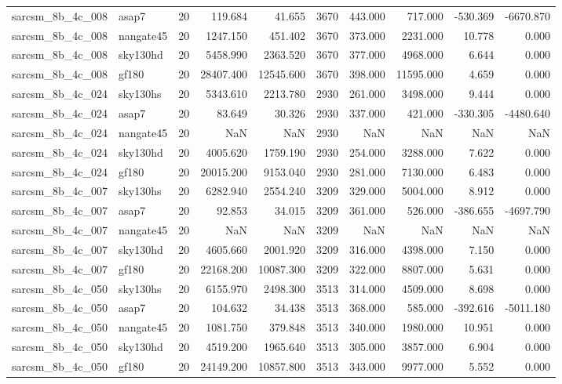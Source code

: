\documentclass{article}
\begin{document}
\begin{longtable}{llrrrrrrrr}
sarcsm\_8b\_4c\_008 & asap7 & 20 & 119.684 & 41.655 & 3670 & 443.000 & 717.000 & -530.369 & -6670.870 \\
sarcsm\_8b\_4c\_008 & nangate45 & 20 & 1247.150 & 451.402 & 3670 & 373.000 & 2231.000 & 10.778 & 0.000 \\
sarcsm\_8b\_4c\_008 & sky130hd & 20 & 5458.990 & 2363.520 & 3670 & 377.000 & 4968.000 & 6.644 & 0.000 \\
sarcsm\_8b\_4c\_008 & gf180 & 20 & 28407.400 & 12545.600 & 3670 & 398.000 & 11595.000 & 4.659 & 0.000 \\
sarcsm\_8b\_4c\_024 & sky130hs & 20 & 5343.610 & 2213.780 & 2930 & 261.000 & 3498.000 & 9.444 & 0.000 \\
sarcsm\_8b\_4c\_024 & asap7 & 20 & 83.649 & 30.326 & 2930 & 337.000 & 421.000 & -330.305 & -4480.640 \\
sarcsm\_8b\_4c\_024 & nangate45 & 20 & NaN & NaN & 2930 & NaN & NaN & NaN & NaN \\
sarcsm\_8b\_4c\_024 & sky130hd & 20 & 4005.620 & 1759.190 & 2930 & 254.000 & 3288.000 & 7.622 & 0.000 \\
sarcsm\_8b\_4c\_024 & gf180 & 20 & 20015.200 & 9153.040 & 2930 & 281.000 & 7130.000 & 6.483 & 0.000 \\
sarcsm\_8b\_4c\_007 & sky130hs & 20 & 6282.940 & 2554.240 & 3209 & 329.000 & 5004.000 & 8.912 & 0.000 \\
sarcsm\_8b\_4c\_007 & asap7 & 20 & 92.853 & 34.015 & 3209 & 361.000 & 526.000 & -386.655 & -4697.790 \\
sarcsm\_8b\_4c\_007 & nangate45 & 20 & NaN & NaN & 3209 & NaN & NaN & NaN & NaN \\
sarcsm\_8b\_4c\_007 & sky130hd & 20 & 4605.660 & 2001.920 & 3209 & 316.000 & 4398.000 & 7.150 & 0.000 \\
sarcsm\_8b\_4c\_007 & gf180 & 20 & 22168.200 & 10087.300 & 3209 & 322.000 & 8807.000 & 5.631 & 0.000 \\
sarcsm\_8b\_4c\_050 & sky130hs & 20 & 6155.970 & 2498.300 & 3513 & 314.000 & 4509.000 & 8.698 & 0.000 \\
sarcsm\_8b\_4c\_050 & asap7 & 20 & 104.632 & 34.438 & 3513 & 368.000 & 585.000 & -392.616 & -5011.180 \\
sarcsm\_8b\_4c\_050 & nangate45 & 20 & 1081.750 & 379.848 & 3513 & 340.000 & 1980.000 & 10.951 & 0.000 \\
sarcsm\_8b\_4c\_050 & sky130hd & 20 & 4519.200 & 1965.640 & 3513 & 305.000 & 3857.000 & 6.904 & 0.000 \\
sarcsm\_8b\_4c\_050 & gf180 & 20 & 24149.200 & 10857.800 & 3513 & 343.000 & 9977.000 & 5.552 & 0.000 \\

\end{longtable}
\end{document}
